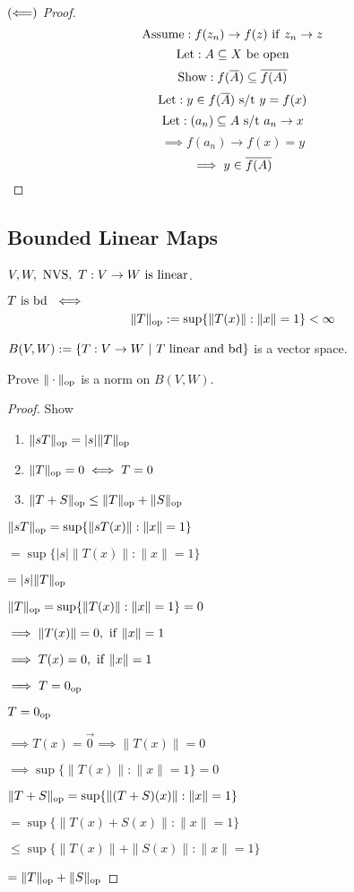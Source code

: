 \documentclass[12pt]{article}
\begin{document}
\bboxproof
\begin{proof}[\((\Longleftarrow)\) Proof]
    \[
        \mathrm{Assume}: f(z_n)\to f(z)\ \mathrm{if}\ z_n\to z
    \]
    \[
        \llet:A\ssq X\ \TR{be\ open}
    \]
    \[
        \mathrm{Show}: f(\overline{A})\subseteq\overline{f(A)}
    \]
    \[
        \mathrm{Let}: y\in f(\overline{A})\text{ s/t } y=f(x)
    \]
    \[
        \mathrm{Let}: (a_n)\subseteq A\text{ s/t } a_n\to x
    \]
    \[
        \implies f(a_n)\to f(x)=y
    \]
    \[
        \implies y\in \overline{f(A)}
    \]
\end{proof}
\ebox

\subsection{Bounded Linear Maps}
\bboxdefn
\begin{defn}
    \(V,W,\ \TR{NVS},\ T:V\to W\ \is\ \TR{linear}\).

    \(T\ \mathrm{is}\ \mathrm{bd}\ \iff\)
    \[
        \|T\|_{\mathrm{op}}:=\sup\{
            \|T(x)\|:\|x\|=1
        \} < \infty
    \]
\end{defn}
\ebox

\bboxprop
\begin{prop}
    \(B(V,W):=\{T:V\to W\ |\ T\ \TR{linear\ and\ bd}\}\) is a vector space.

    Prove \(\|\cdot\|_{\mathrm{op}}\) is a norm on \(B(V,W)\).
\end{prop}
\ebox

\bboxproof
\begin{proof}
    Show
    \begin{enumerate}
        \item \(\|sT\|_{\mathrm{op}} = |s|\|T\|_{\mathrm{op}}\)
        \item \(\|T\|_{\mathrm{op}}=0\iff T=0\)
        \item \(\|T+S\|_{\mathrm{op}}\le\|T\|_{\mathrm{op}}+\|S\|_{\mathrm{op}}\)
    \end{enumerate}

     \(\|sT\|_{\mathrm{op}}=\sup\{\|sT(x)\|:\|x\|=1\}\)

    \(=\sup\{|s|\|T(x)\|:\|x\|=1\}\)

    \(=|s|\|T\|_{\mathrm{op}}\)

    \(\|T\|_{\mathrm{op}}=\sup\{\|T(x)\|:\|x\|=1\}=0\)

    \(\implies \|T(x)\|=0,\ \iif\ \|x\|=1\)

    \(\implies T(x)=0,\ \iif\ \|x\|=1\)

    \(\implies T=0_{\mathrm{op}}\)

    \(T=0_{\mathrm{op}}\)

    \(\implies T(x)=\vec 0\implies \|T(x)\|=0\)

    \(\implies \sup\{\|T(x)\|:\|x\|=1\} = 0\)

    \(\|T+S\|_{\mathrm{op}}=
    \sup\{\|(T+S)(x)\|:\|x\|=1\}\)

    \(=\sup\{\|T(x) + S(x)\|:\|x\|=1\}\)

    \(\le\sup\{\|T(x)\|+\|S(x)\|:\|x\|=1\}\)
    
    \(=\|T\|_{\mathrm{op}}+\|S\|_{\mathrm{op}}\)
\end{proof}
\ebox
\end{document}
